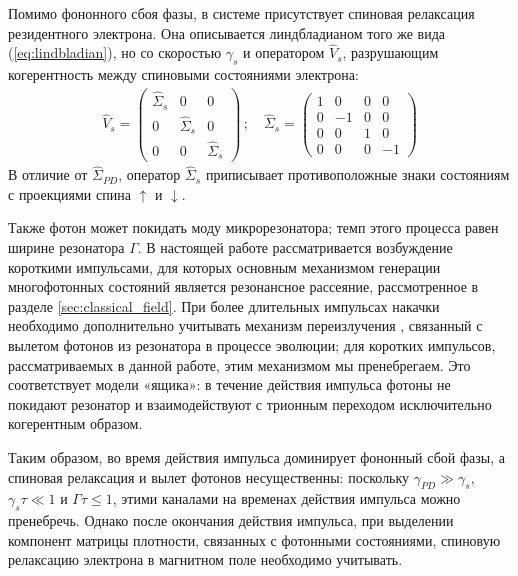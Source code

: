 \documentclass[11pt]{article}    %
\numberwithin{equation}{section}
\begin{document}
Помимо фононного сбоя фазы, в системе присутствует спиновая релаксация
резидентного электрона. Она описывается линдбладианом того же вида
(\ref{eq:lindbladian}), но со скоростью $\gamma_s$ и оператором
$\hat{V}_s$, разрушающим когерентность между спиновыми
состояниями электрона:
\begin{gather}
    \hat{V}_{s} =
\begin{pmatrix}
    \hat{\Sigma}_{s} & 0 & 0 \\
    0 & \hat{\Sigma}_{s} & 0 \\
    0 & 0 & \hat{\Sigma}_{s}
\end{pmatrix} \, ; \quad
    \hat{\Sigma}_{s} =
\begin{pmatrix}
    1 & 0 & 0 & 0 \\
    0 & -1 & 0 & 0 \\
    0 & 0 & 1 & 0 \\
    0 & 0 & 0 & -1
\end{pmatrix}
\end{gather}
В отличие от $\hat{\Sigma}_{PD}$, оператор $\hat{\Sigma}_s$ приписывает
противоположные знаки состояниям с проекциями спина $\uparrow$ и
$\downarrow$.

Также фотон может покидать моду микрорезонатора; темп этого процесса
равен ширине резонатора $\Gamma$. В настоящей работе рассматривается
возбуждение короткими импульсами, для которых основным механизмом
генерации многофотонных состояний является резонансное рассеяние,
рассмотренное в разделе \ref{sec:classical_field}. При более длительных
импульсах накачки необходимо дополнительно учитывать механизм
переизлучения \cite{fischer2017, fischer2018}, связанный с вылетом
фотонов из резонатора в процессе эволюции; для коротких импульсов,
рассматриваемых в данной работе, этим механизмом мы пренебрегаем. Это
соответствует модели «ящика»: в течение действия импульса фотоны не
покидают резонатор и взаимодействуют с трионным переходом исключительно
когерентным образом.

Таким образом, во время действия импульса доминирует фононный сбой
фазы, а спиновая релаксация и вылет фотонов несущественны: поскольку
$\gamma_{PD} \gg \gamma_s$, $\gamma_s \tau \ll 1$ и $\Gamma \tau \leq 1$,
этими каналами на временах действия импульса можно пренебречь. Однако
после окончания действия импульса, при выделении компонент матрицы
плотности, связанных с фотонными состояниями, спиновую релаксацию
электрона в магнитном поле необходимо учитывать.
\end{document}
